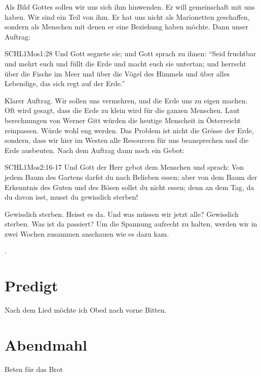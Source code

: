 \documentclass{../../inc/mybib}
\begin{document}
\begin{spacing}{1.5}
\begin{block}
    Als Bild Gottes sollen wir uns sich ihm hinwenden. Er will gemeinschaft mit uns haben. Wir sind ein Teil von ihm. Er hat uns nicht als Marionetten geschaffen, sondern als Menschen mit denen er eine Beziehung haben möchte. Dann unser Auftrag:
    \begin{bibelbox}{SCHL}{1Mos}{1:28}
        Und Gott segnete sie; und Gott sprach zu ihnen: \enquote{Seid fruchtbar und mehrt euch und füllt die Erde und macht euch sie untertan; und herrscht über die Fische im Meer und über die Vögel des Himmels und über alles Lebendige, das sich regt auf der Erde.}
    \end{bibelbox}
    Klarer Auftrag. Wir sollen uns vermehren, und die Erde uns zu eigen machen. Oft wird gesagt, dass die Erde zu klein wird für die ganzen Menschen. Laut berechnungen von Werner Gitt würden die heutige Menscheit in Österreicht reinpassen. Würde wohl eng werden. Das Problem ist nicht die Grösse der Erde, sondern, dass wir hier im Westen alle Resourcen für uns beansprechen und die Erde ausbeuten.
    Nach dem Auftrag dann noch ein Gebot:
    \begin{bibelbox}{SCHL}{1Mos}{2:16-17}
        Und Gott der Herr gebot dem Menschen und sprach: \flqq Von jedem Baum des Gartens darfst du nach Belieben essen; aber von dem Baum der Erkenntnis des Guten und des Bösen sollst du nicht essen; denn an dem Tag, da du davon isst, musst du gewisslich sterben!\frqq
    \end{bibelbox}
    Gewisslich sterben. Heisst es da. Und was müssen wir jetzt alle? Gewisslich sterben. Was ist da passiert? Um die Spannung aufrecht zu halten, werden wir in zwei Wochen zusammen anschauen wie es dazu kam.
   \end{block}
   
\end{spacing}
.

\section{Predigt}
Nach dem Lied möchte ich Obed nach vorne Bitten.

 \section{Abendmahl}
 
 Beten für das Brot 

\end{document}
